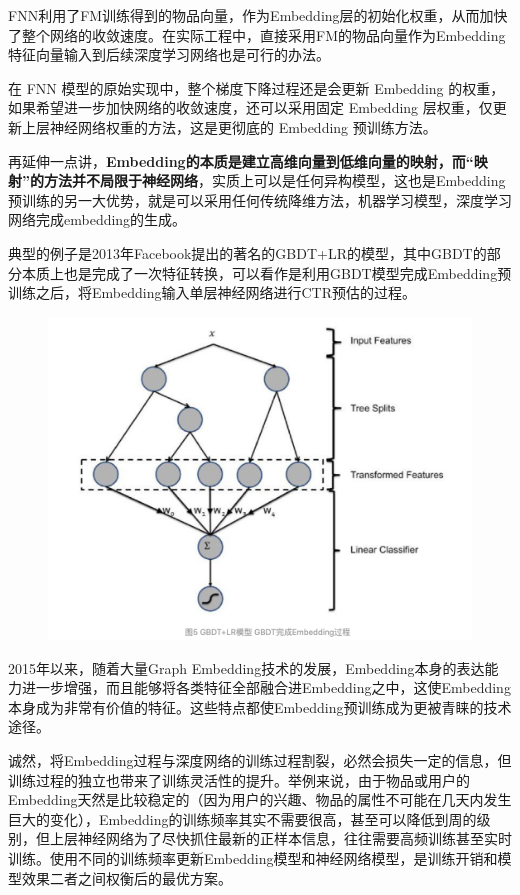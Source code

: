 \documentclass[12pt]{article}
\begin{document}
FNN利用了FM训练得到的物品向量，作为Embedding层的初始化权重，从而加快了整个网络的收敛速度。在实际工程中，直接采用FM的物品向量作为Embedding特征向量输入到后续深度学习网络也是可行的办法。

在 FNN 模型的原始实现中，整个梯度下降过程还是会更新 Embedding 的权重，如果希望进一步加快网络的收敛速度，还可以采用固定 Embedding 层权重，仅更新上层神经网络权重的方法，这是更彻底的 Embedding 预训练方法。

再延伸一点讲，\textbf{Embedding的本质是建立高维向量到低维向量的映射，而“映射”的方法并不局限于神经网络}，实质上可以是任何异构模型，这也是Embedding预训练的另一大优势，就是可以采用任何传统降维方法，机器学习模型，深度学习网络完成embedding的生成。

典型的例子是2013年Facebook提出的著名的GBDT+LR的模型，其中GBDT的部分本质上也是完成了一次特征转换，可以看作是利用GBDT模型完成Embedding预训练之后，将Embedding输入单层神经网络进行CTR预估的过程。

\begin{figure}[H]
    \centering
    \includegraphics[width=.6\textwidth]{fig/Embedding_GBDT_LR.png}
\end{figure}

2015年以来，随着大量Graph Embedding技术的发展，Embedding本身的表达能力进一步增强，而且能够将各类特征全部融合进Embedding之中，这使Embedding本身成为非常有价值的特征。这些特点都使Embedding预训练成为更被青睐的技术途径。

诚然，将Embedding过程与深度网络的训练过程割裂，必然会损失一定的信息，但训练过程的独立也带来了训练灵活性的提升。举例来说，由于物品或用户的Embedding天然是比较稳定的（因为用户的兴趣、物品的属性不可能在几天内发生巨大的变化），Embedding的训练频率其实不需要很高，甚至可以降低到周的级别，但上层神经网络为了尽快抓住最新的正样本信息，往往需要高频训练甚至实时训练。使用不同的训练频率更新Embedding模型和神经网络模型，是训练开销和模型效果二者之间权衡后的最优方案。
\end{document}
